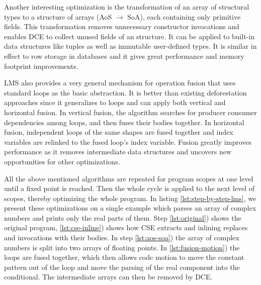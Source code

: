 Another interesting optimization is the transformation of an array of structural types to a structure of arrays (AoS $\rightarrow$ SoA), each containing only primitive fields. This transformation removes unnecessary constructor invocations and enables DCE to collect unused fields of an structure. It can be applied to built-in data structures like tuples as well as immutable user-defined types. It is similar in effect to row storage in databases and it gives great performance and memory footprint improvements.

LMS also provides a very general mechanism for operation fusion that uses standard loops as the basic abstraction. It is better than existing deforestation approaches since it generalizes to loops and can apply both vertical and horizontal fusion. In vertical fusion, the algorithm searches for producer consumer dependencies among loops, and then fuses their bodies together. In horizontal fusion, independent loops of the same shapes are fused together and index variables are relinked to the fused loop's index variable. Fusion greatly improves performance as it removes intermediate data structures and uncovers new opportunities for other optimizations.

All the above mentioned algorithms are repeated for program scopes at one level until a fixed point is reached. Then the whole cycle is applied to the next level of scopes, thereby optimizing the whole program. In listing \ref{lst:step-by-step-lms}, we present these optimizations on a single example which parses an array of complex numbers and prints only the real parts of them. Step \ref{lst:original}) shows the original program, \ref{lst:cse-inline}) shows how CSE extracts  and inlining replaces  and  invocations with their bodies. In step \ref{lst:aos-soa}) the array  of complex numbers is split into two arrays of floating points. 
In \ref{lst:fusion-motion}) the loops are fused together, which then allows code motion to move the constant pattern out of the loop and move the parsing of the real component into the conditional. The intermediate arrays can then be removed by DCE.

